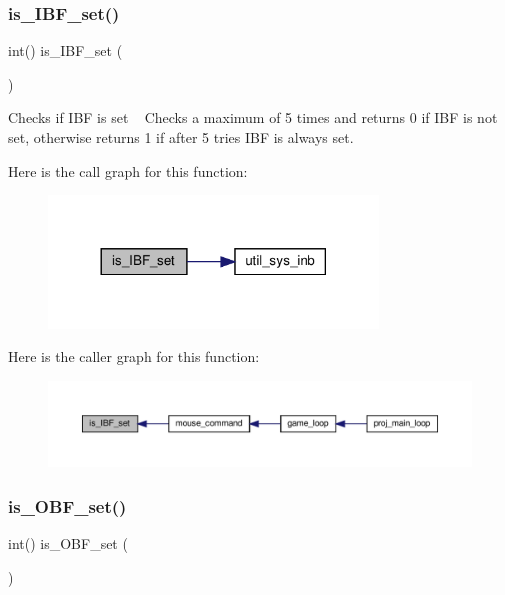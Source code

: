 \subsubsection{\texorpdfstring{is\+\_\+\+I\+B\+F\+\_\+set()}{is\_IBF\_set()}}
{\footnotesize\ttfamily int() is\+\_\+\+I\+B\+F\+\_\+set (\begin{DoxyParamCaption}{ }\end{DoxyParamCaption})}



Checks if I\+BF is set ~\newline
 Checks a maximum of 5 times and returns 0 if I\+BF is not set, otherwise returns 1 if after 5 tries I\+BF is always set. 

Here is the call graph for this function\+:
\nopagebreak
\begin{figure}[H]
\begin{center}
\leavevmode
\includegraphics[width=248pt]{group__mouse_gae5173853c368d50dd463f5c72a63ded9_cgraph}
\end{center}
\end{figure}
Here is the caller graph for this function\+:
\nopagebreak
\begin{figure}[H]
\begin{center}
\leavevmode
\includegraphics[width=350pt]{group__mouse_gae5173853c368d50dd463f5c72a63ded9_icgraph}
\end{center}
\end{figure}
\mbox{\label{group__mouse_ga3a67eb6eb302f8140a3a6d16d40c86af}} 
\subsubsection{\texorpdfstring{is\+\_\+\+O\+B\+F\+\_\+set()}{is\_OBF\_set()}}
{\footnotesize\ttfamily int() is\+\_\+\+O\+B\+F\+\_\+set (\begin{DoxyParamCaption}{ }\end{DoxyParamCaption})}



